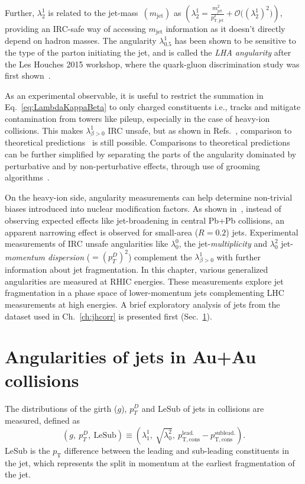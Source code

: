 %
Further, \(\lambda_2^1\) is related to the jet-mass~\((m_\mathrm{jet})\) as  \(\left(\lambda_2^1 = \frac{m^2_\mathrm{jet}}{p_\mathrm{T, jet}^2} + \mathcal{O}\big((\lambda_2^1)^2\big) \right)\), providing an IRC-safe way of accessing \(m_\mathrm{jet}\) information as it doesn't directly depend on hadron masses.
%
The angularity \(\lambda_{0.5}^1\) has been shown to be sensitive to the type of the parton initiating the jet, and is called the \emph{LHA angularity} after the Les Houches 2015 workshop, where the quark-gluon discrimination study was first shown~\cite{Andersen:2016qtm}.

As an experimental observable, it is useful to restrict the summation in Eq.~\ref{eq:LambdaKappaBeta} to only charged constituents i.e., tracks and mitigate contamination from towers like pileup, especially in the case of heavy-ion collisions.  
%
This makes \(\lambda_{\beta > 0}^1\)  IRC unsafe, but as shown in Refs.~\cite{Chang_2013,ALICE:2021njq}, comparison to theoretical predictions~\cite{Kang_2018,Kang:2018vgn} is still possible. 
%
Comparisons to theoretical predictions can be further simplified by separating the parts of the angularity dominated by perturbative and by non-perturbative effects, through use of grooming algorithms~\cite{Dasgupta_2013,Chien:2019osu}. 

On the heavy-ion side, angularity measurements can help determine non-trivial biases introduced into nuclear modification factors. As shown in~\cite{Alice2018}, instead of observing expected effects like jet-broadening in central Pb+Pb collisions, an apparent narrowing effect is observed for small-area (\(R=0.2\)) jets. 
%
Experimental measurements of IRC unsafe angularities like \(\lambda_0^0\), the jet-\emph{multiplicity} and \(\lambda_0^2\) jet-\emph{momentum dispersion} (\(= (p_T^D)^2\)) complement the \(\lambda_{\beta > 0}^1\)  with further information about jet fragmentation. 
%
In this chapter, various generalized angularities are measured at RHIC energies. 
%
These measurements explore jet fragmentation in a phase space of lower-momentum jets complementing LHC measurements at high energies. 
%
A brief exploratory analysis of jets from the \AuAu dataset used in Ch.~\ref{ch:jhcorr} is presented first (Sec.~\ref{sec:AuAuAngularities}).

\section{Angularities of jets in Au+Au collisions}
\label{sec:AuAuAngularities}
The distributions of the girth (\(g\)), \(p^D_T\) and LeSub of jets in \AuAu collisions are measured, defined as
%
\begin{equation}
	\label{eq:AuAuJSODefs}
	\left(g,~p^D_T,~\text{LeSub}\right) \equiv \left(\lambda_1^1,~\sqrt{\lambda_0^2},~p_\mathrm{T, cons}^\mathrm{lead.} - p_\mathrm{T, cons}^\mathrm{sublead.}\right).
\end{equation}
%
LeSub is the \(p_\mathrm{T}\) difference between the leading and sub-leading constituents in the jet, which represents the split in momentum at the earliest fragmentation of the jet. 
%

